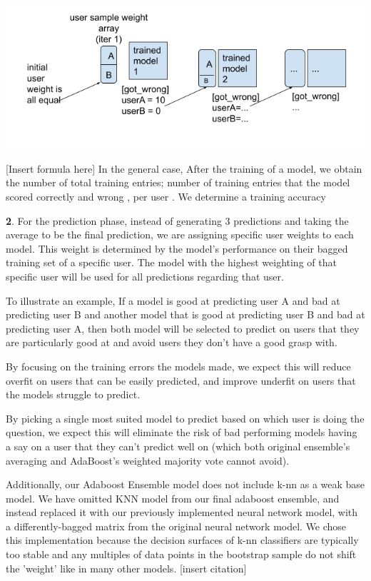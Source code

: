 \documentclass{article}
\begin{document}
    \includegraphics[scale=0.5]{figures/pb_f2.png}

    [Insert formula here]
    In the general case, After the training of a model, we obtain the number of total training entries; number of training entries that the model scored correctly {} and wrong {}, per user {}.
    We determine a training accuracy %

    \textbf{2}. For the prediction phase, instead of generating 3 predictions and taking the average to be the final prediction, we are assigning specific user weights to each model. This weight is determined by the model’s performance on their bagged training set of a specific user. The model with the highest weighting of that specific user will be used for all predictions regarding that user.

    To illustrate an example, If a model is good at predicting user A and bad at predicting user B and another model that is good at predicting user B and bad at predicting user A, then both model will be selected to predict on users that they are particularly good at and avoid users they don’t have a good grasp with.

    By focusing on the training errors the models made, we expect this will reduce overfit on users that can be easily predicted, and improve underfit on users that the models struggle to predict. 

    By picking a single most suited model to predict based on which user is doing the question, we expect this will eliminate the risk of bad performing models having a say on a user that they can’t predict well on (which both original ensemble’s averaging and AdaBoost’s weighted majority vote cannot avoid).

    Additionally, our Adaboost Ensemble model does not include k-nn as a weak base model. We have omitted KNN model from our final adaboost ensemble, and instead replaced it with our previously implemented neural network model, with a differently-bagged matrix from the original neural network model. We chose this implementation because the decision surfaces of k-nn classifiers are typically too stable and any multiples of data points in the bootstrap sample do not shift the 'weight' like in many other models. [insert citation]
\end{document}
